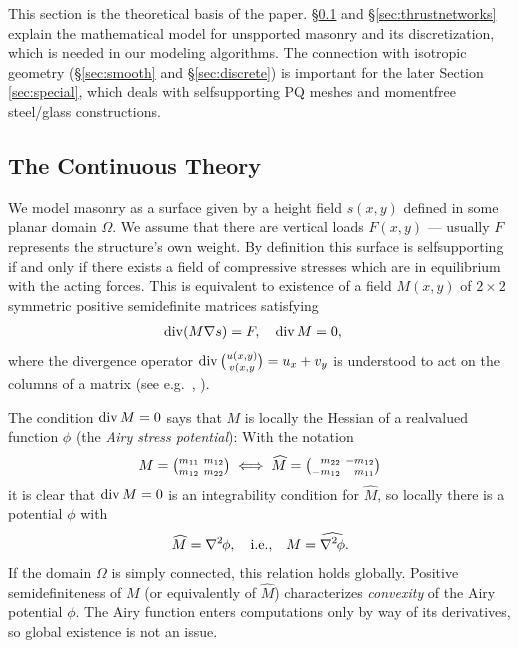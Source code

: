 \documentclass[review]{acmsiggraph}
\def\wh{\widehat}
\def\Div{\mathop{{\rm div}}\nolimits}
\def\ess{s}
\def\Hess#1{{\def\testess{#1}\nabla^2\ifx\testess\ess\!s\else #1\fi}}
\def\Hess#1{\text{$\nabla^2\hskip-.2ex #1$}}
\begin{document}
This section is the theoretical basis of the paper. \S\ref{ssec:cont}
and \S\ref{sec:thrustnetworks} explain the mathematical
model for unspported masonry and its discretization, which is needed in our
modeling algorithms. The connection
with isotropic geometry (\S\ref{sec:smooth} and \S\ref{sec:discrete})
is important for the later Section \ref{sec:special},
which deals with self\dash supporting PQ meshes and
moment\dash free steel\slash glass constructions.

\subsection{The Continuous Theory}
\label{ssec:cont}

We model masonry as a surface given by a height field $s(x,y)$
defined in some planar domain $\Omega$. We assume that there are vertical
loads $F(x,y)$ --- usually $F$ represents the structure's own weight. By
definition this surface is self\dash supporting if and only if there
exists a field of compressive stresses which are in equilibrium with the
acting forces. This is equivalent to existence of a field $M(x,y)$ of
$2\times 2$ symmetric positive semidefinite matrices satisfying
	\begin{align}
	\Div (M\nabla s) = F, \quad
	\Div M &= 0,
	  \label{eq:conds}
	\end{align}
 where the divergence operator $\Div{u(x,y)\choose v(x,y}= u_x + v_y$ is
understood to act on the columns of a matrix (see e.g.\
\cite{Fraternali2010}, \cite{Giaquinta1985}).

The condition $\Div M=0$ says that $M$ is locally the Hessian of a
real\dash valued function $\phi$ (the {\em Airy stress potential}): With
the notation
	\begin{align*}
	M =
	{\textstyle {m_{11} \ m_{12} \choose m_{12} \ m_{22}}}
	\iff	
	\wh M =
	{\textstyle {\hphantom{-}m_{22} \ -m_{12} \choose -m_{12}
		 \ \hphantom{-}m_{11}}}
	\end{align*}
 it is clear that $\Div M=0$ is an integrability condition for $\wh M$, so
locally there is a potential $\phi$ with
	\begin{align*}
	\wh M = \Hess\phi, \quad \text{i.e.,}\quad
	M = \wh{\Hess\phi}.
	\end{align*}
 If the domain $\Omega$ is simply connected, this relation holds globally.
Positive semidefiniteness of $M$ (or equivalently of $\wh M$)
characterizes {\em convexity} of the Airy potential $\phi$. The Airy
function enters computations only by way of its derivatives, so global
existence is not an issue.
\end{document}
